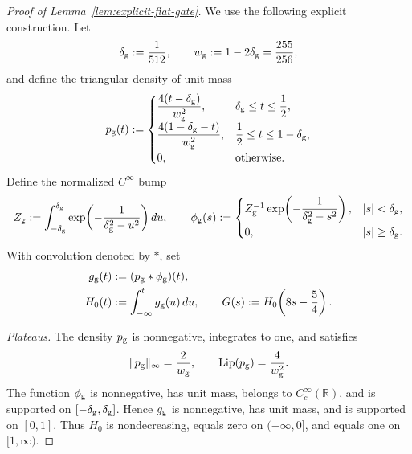 \documentclass{article}
\newcommand{\R}{\mathbb{R}}
\theoremstyle{definition}
\begin{document}
\begin{proof}[Proof of Lemma~\ref{lem:explicit-flat-gate}]
We use the following explicit construction.  Let
\begin{equation}
 \delta_{\rm g}:=\frac1{512},
 \qquad
 w_{\rm g}:=1-2\delta_{\rm g}=\frac{255}{256},
\end{equation}
and define the triangular density of unit mass
\begin{equation}
 p_{\rm g}(t):=
 \begin{cases}
 \dfrac{4(t-\delta_{\rm g})}{w_{\rm g}^2},
    &\delta_{\rm g}\le t\le\dfrac12,\\[2mm]
 \dfrac{4(1-\delta_{\rm g}-t)}{w_{\rm g}^2},
    &\dfrac12\le t\le1-\delta_{\rm g},\\[2mm]
 0,&\text{otherwise}.
 \end{cases}
 \label{eq:triangular-density}
\end{equation}
Define the normalized $C^\infty$ bump
\begin{equation}
 Z_{\rm g}:=\int_{-\delta_{\rm g}}^{\delta_{\rm g}}
 \exp\!\left(-\frac1{\delta_{\rm g}^2-u^2}\right)du,
 \qquad
 \phi_{\rm g}(s):=
 \begin{cases}
 Z_{\rm g}^{-1}\exp\!\left(-\dfrac1{\delta_{\rm g}^2-s^2}\right),
    &|s|<\delta_{\rm g},\\[2mm]
 0,&|s|\ge\delta_{\rm g}.
 \end{cases}
 \label{eq:gate-smoothing-bump}
\end{equation}
With convolution denoted by $*$, set
\begin{equation}
 \begin{aligned}
 g_{\rm g}(t)&:=(p_{\rm g}*\phi_{\rm g})(t),\\
 H_0(t)&:=\int_{-\infty}^t g_{\rm g}(u)\,du,
 \qquad
 G(s):=H_0\!\left(8s-\frac54\right).
 \end{aligned}
 \label{eq:explicit-infinite-gate}
\end{equation}

\emph{Plateaus.}
The density $p_{\rm g}$ is nonnegative, integrates to one, and satisfies
\begin{equation}
 \|p_{\rm g}\|_\infty=\frac2{w_{\rm g}},
 \qquad
 \operatorname{Lip}(p_{\rm g})=\frac4{w_{\rm g}^2}.
 \label{eq:triangular-bounds}
\end{equation}
The function $\phi_{\rm g}$ is nonnegative, has unit mass, belongs to
$C_c^\infty(\R)$, and is supported on
$[-\delta_{\rm g},\delta_{\rm g}]$.  Hence $g_{\rm g}$ is
nonnegative, has unit mass, and is supported on $[0,1]$.  Thus $H_0$ is
nondecreasing, equals zero on $(-\infty,0]$, and equals one on $[1,\infty)$.


\end{proof}
\end{document}
